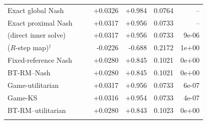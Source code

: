 \begin{tabular}{l r r r r r r}
\quad Exact global Nash &  &  & +0.0326 & +0.984 & 0.0764 & -- \\
\quad Exact proximal Nash &  &  & +0.0317 & +0.956 & 0.0733 & -- \\
\quad \NBPO{} (direct inner solve) &  &  & +0.0317 & +0.956 & 0.0733 & 9e-06 \\
\quad \NBPO{} ($R$-step map)$^{\dagger}$ &  &  & -0.0226 & -0.688 & 0.2172 & 1e+00 \\
\quad Fixed-reference Nash &  &  & +0.0280 & +0.845 & 0.1021 & 0e+00 \\
\quad BT-RM--Nash &  &  & +0.0280 & +0.845 & 0.1021 & 0e+00 \\
\quad Game-utilitarian &  &  & +0.0317 & +0.956 & 0.0733 & 6e-07 \\
\quad Game-KS &  &  & +0.0316 & +0.954 & 0.0733 & 4e-07 \\
\quad BT-RM--utilitarian &  &  & +0.0280 & +0.843 & 0.1023 & 0e+00 \\
\addlinespace
\bottomrule
\end{tabular}
